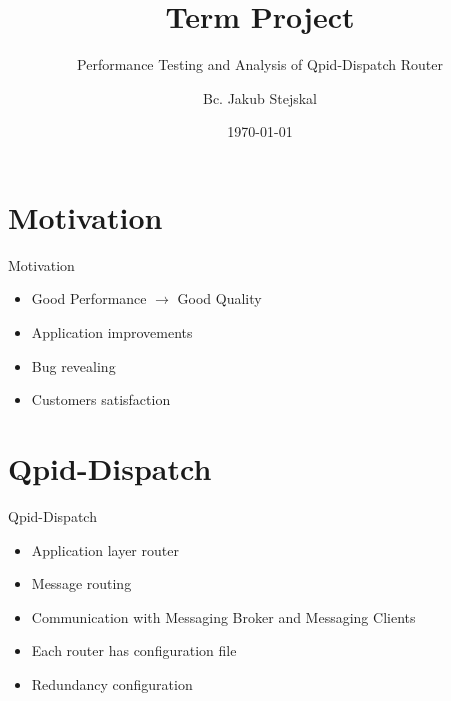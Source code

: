 \documentclass[hyperref={pdfpagelabels=false, unicode},pdf,slideColor,fyma,9pt]{beamer}
\title{Term Project}
\subtitle{Performance Testing and Analysis of Qpid-Dispatch Router}
\author[]{Bc. Jakub Stejskal}
\institute[FIT]{Faculty of Information Technology}
\date[]{\today}
\begin{document}
		\begin{frame}
				\titlepage
		\end{frame}
		
		\section{Motivation}
		\begin{frame}{Motivation}
				\begin{itemize}
						\item Good Performance $\rightarrow$ Good Quality
						\item Application improvements
						\item Bug revealing
						\item Customers satisfaction
				\end{itemize}
		\end{frame}
		\section{Qpid-Dispatch}
		\begin{frame}{Qpid-Dispatch}
				\begin{itemize}
						\item Application layer router 
						\item Message routing
						\item Communication with Messaging Broker and Messaging Clients		
						\item Each router has configuration file 
						\item Redundancy configuration
				\end{itemize}						
		\end{frame}
\end{document}
